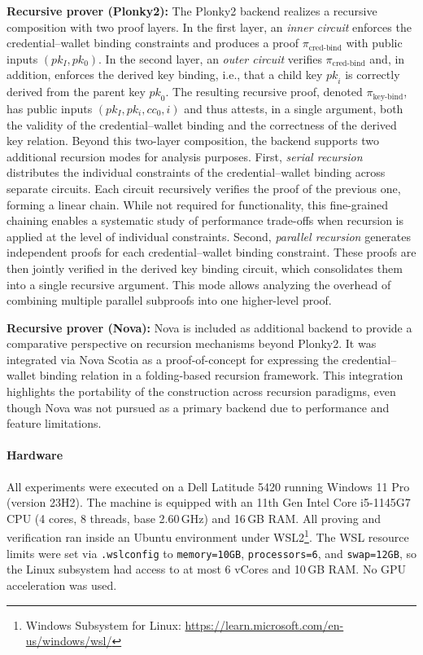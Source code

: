 \medskip
\textbf{Recursive prover (Plonky2):} The Plonky2 backend realizes a recursive composition with two proof layers. In the first layer, an \emph{inner circuit} enforces the credential–wallet binding constraints and produces a proof $\pi_{\text{cred-bind}}$ with public inputs $(pk_I, pk_0)$. In the second layer, an \emph{outer circuit} verifies $\pi_{\text{cred-bind}}$ and, in addition, enforces the derived key binding, i.e., that a child key $\mathit{pk}_i$ is correctly derived from the parent key $\mathit{pk}_0$. The resulting recursive proof, denoted $\pi_{\text{key-bind}}$, has public inputs $(pk_I, pk_i, cc_0, i)$ and thus attests, in a single argument, both the validity of the credential–wallet binding and the correctness of the derived key relation. Beyond this two-layer composition, the backend supports two additional recursion modes for analysis purposes. First, \emph{serial recursion} distributes the individual constraints of the credential–wallet binding across separate circuits. Each circuit recursively verifies the proof of the previous one, forming a linear chain. While not required for functionality, this fine-grained chaining enables a systematic study of performance trade-offs when recursion is applied at the level of individual constraints. Second, \emph{parallel recursion} generates independent proofs for each credential–wallet binding constraint. These proofs are then jointly verified in the derived key binding circuit, which consolidates them into a single recursive argument. This mode allows analyzing the overhead of combining multiple parallel subproofs into one higher-level proof.

\medskip
\textbf{Recursive prover (Nova):} Nova is included as additional backend to provide a comparative perspective on recursion mechanisms beyond Plonky2. It was integrated via Nova Scotia as a proof-of-concept for expressing the credential–wallet binding relation in a folding-based recursion framework. This integration highlights the portability of the construction across recursion paradigms, even though Nova was not pursued as a primary backend due to performance and feature limitations.

\paragraph{Hardware}
All experiments were executed on a Dell Latitude 5420 running Windows 11 Pro (version 23H2). The machine is equipped with an 11th Gen Intel Core i5-1145G7 CPU (4 cores, 8 threads, base 2.60\,GHz) and 16\,GB RAM. All proving and verification ran inside an Ubuntu environment under WSL2\footnote{Windows Subsystem for Linux: \url{https://learn.microsoft.com/en-us/windows/wsl/}}. The WSL resource limits were set via \texttt{.wslconfig} to \texttt{memory=10GB}, \texttt{processors=6}, and \texttt{swap=12GB}, so the Linux subsystem had access to at most 6 vCores and 10\,GB RAM. No GPU acceleration was used.
